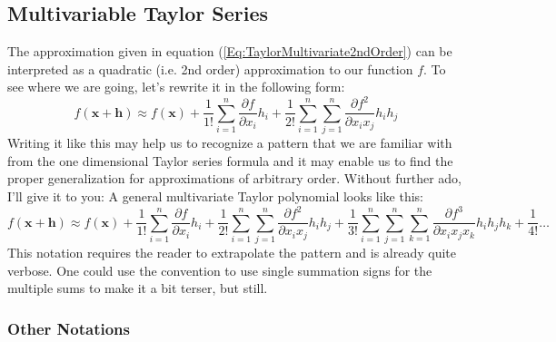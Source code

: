 
\subsection{Multivariable Taylor Series} 
The approximation given in equation (\ref{Eq:TaylorMultivariate2ndOrder}) can be interpreted as a quadratic (i.e. 2nd order) approximation to our function $f$. To see where we are going, let's rewrite it in the following form:
\begin{equation}
 f(\mathbf{x + h}) \approx
 f(\mathbf{x}) + 
 \frac{1}{1!} \sum_{i=1}^{n} \frac{\partial f}{\partial x_i} h_i + 
 \frac{1}{2!} \sum_{i=1}^{n} \sum_{j=1}^{n}  \frac{\partial f^2}{\partial x_i x_j} h_i h_j
\end{equation}
Writing it like this may help us to recognize a pattern that we are familiar with from the one dimensional Taylor series formula and it may enable us to find the proper generalization for approximations of arbitrary order. Without further ado, I'll give it to you: A general multivariate Taylor polynomial looks like this:
\begin{equation}
\label{Eq:TaylorSeriesMultiDim}
 f(\mathbf{x + h}) \approx
 f(\mathbf{x}) + 
 \frac{1}{1!} \sum_{i=1}^{n} 
              \frac{\partial f} {\partial x_i} h_i + 
 \frac{1}{2!} \sum_{i=1}^{n} \sum_{j=1}^{n}  
              \frac{\partial f^2}{\partial x_i x_j} h_i h_j +
 \frac{1}{3!} \sum_{i=1}^{n} \sum_{j=1}^{n}  \sum_{k=1}^{n} 
              \frac{\partial f^3}{\partial x_i x_j x_k} h_i h_j h_k + 
 \frac{1}{4!}  \ldots              
\end{equation}
This notation requires the reader to extrapolate the pattern and is already quite verbose. One could use the convention to use single summation signs for the multiple sums to make it a bit terser, but still.


\subsubsection{Other Notations}

